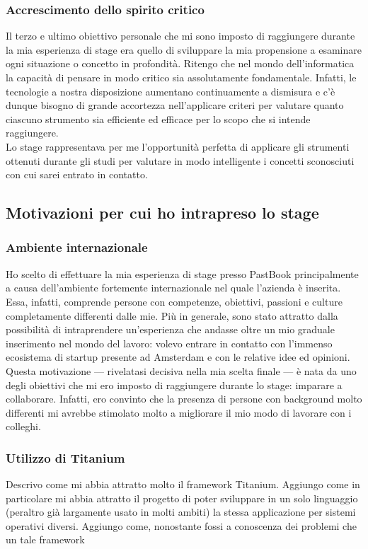 			\subsubsection{Accrescimento dello spirito critico}
				Il terzo e ultimo obiettivo personale che mi sono imposto di raggiungere durante la mia esperienza di stage era
				quello di sviluppare la mia propensione a esaminare ogni situazione o concetto in profondità. Ritengo che nel mondo
				dell'informatica la capacità di pensare in modo critico sia assolutamente fondamentale. Infatti, le tecnologie a
				nostra disposizione aumentano continuamente a dismisura e c'è dunque bisogno di grande accortezza nell'applicare
				criteri per valutare quanto ciascuno strumento sia efficiente ed efficace per lo scopo che si intende raggiungere.\\
				Lo stage rappresentava per me l'opportunità perfetta di applicare gli strumenti ottenuti durante gli studi per
				valutare in modo intelligente i concetti sconosciuti con cui sarei entrato in contatto.
		\subsection{Motivazioni per cui ho intrapreso lo stage}
			\subsubsection{Ambiente internazionale}
				Ho scelto di effettuare la mia esperienza di stage presso PastBook principalmente a causa dell'ambiente fortemente
				internazionale nel quale l'azienda è inserita. Essa, infatti, comprende persone con competenze, obiettivi, passioni
				e culture completamente differenti dalle mie. Più in generale, sono stato attratto dalla possibilità di intraprendere
				un'esperienza che andasse oltre un mio graduale inserimento nel mondo del lavoro: volevo entrare in contatto con
				l'immenso ecosistema di startup presente ad Amsterdam e con le relative idee ed opinioni.\\
				Questa motivazione — rivelatasi decisiva nella mia scelta finale — è nata da uno degli obiettivi che mi ero imposto
				di raggiungere durante lo stage: imparare a collaborare. Infatti, ero convinto che la presenza di persone con
				background molto differenti mi avrebbe stimolato molto a migliorare il mio modo di lavorare con i colleghi.
			\subsubsection{Utilizzo di Titanium}
				Descrivo come mi abbia attratto molto il framework Titanium. Aggiungo come in particolare mi abbia attratto il
				progetto di poter sviluppare in un solo linguaggio (peraltro già largamente usato in molti ambiti) la stessa
				applicazione per sistemi operativi diversi. Aggiungo come, nonostante fossi a conoscenza dei problemi che un tale
				framework 
